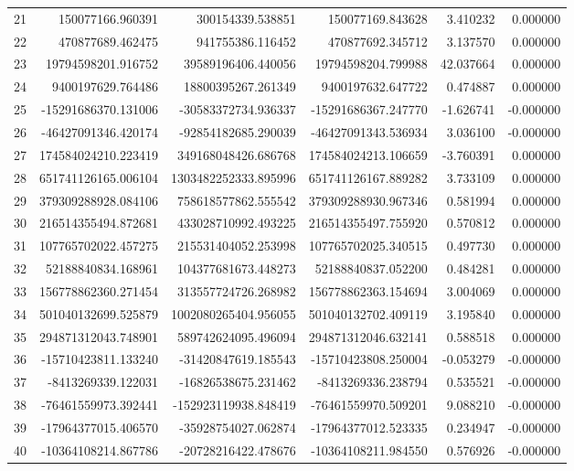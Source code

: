 \begin{tabular}{lrrrrr}
21 & 150077166.960391 & 300154339.538851 & 150077169.843628 & 3.410232 & 0.000000 \\
22 & 470877689.462475 & 941755386.116452 & 470877692.345712 & 3.137570 & 0.000000 \\
23 & 19794598201.916752 & 39589196406.440056 & 19794598204.799988 & 42.037664 & 0.000000 \\
24 & 9400197629.764486 & 18800395267.261349 & 9400197632.647722 & 0.474887 & 0.000000 \\
25 & -15291686370.131006 & -30583372734.936337 & -15291686367.247770 & -1.626741 & -0.000000 \\
26 & -46427091346.420174 & -92854182685.290039 & -46427091343.536934 & 3.036100 & -0.000000 \\
27 & 174584024210.223419 & 349168048426.686768 & 174584024213.106659 & -3.760391 & 0.000000 \\
28 & 651741126165.006104 & 1303482252333.895996 & 651741126167.889282 & 3.733109 & 0.000000 \\
29 & 379309288928.084106 & 758618577862.555542 & 379309288930.967346 & 0.581994 & 0.000000 \\
30 & 216514355494.872681 & 433028710992.493225 & 216514355497.755920 & 0.570812 & 0.000000 \\
31 & 107765702022.457275 & 215531404052.253998 & 107765702025.340515 & 0.497730 & 0.000000 \\
32 & 52188840834.168961 & 104377681673.448273 & 52188840837.052200 & 0.484281 & 0.000000 \\
33 & 156778862360.271454 & 313557724726.268982 & 156778862363.154694 & 3.004069 & 0.000000 \\
34 & 501040132699.525879 & 1002080265404.956055 & 501040132702.409119 & 3.195840 & 0.000000 \\
35 & 294871312043.748901 & 589742624095.496094 & 294871312046.632141 & 0.588518 & 0.000000 \\
36 & -15710423811.133240 & -31420847619.185543 & -15710423808.250004 & -0.053279 & -0.000000 \\
37 & -8413269339.122031 & -16826538675.231462 & -8413269336.238794 & 0.535521 & -0.000000 \\
38 & -76461559973.392441 & -152923119938.848419 & -76461559970.509201 & 9.088210 & -0.000000 \\
39 & -17964377015.406570 & -35928754027.062874 & -17964377012.523335 & 0.234947 & -0.000000 \\
40 & -10364108214.867786 & -20728216422.478676 & -10364108211.984550 & 0.576926 & -0.000000 \\

\end{tabular}
